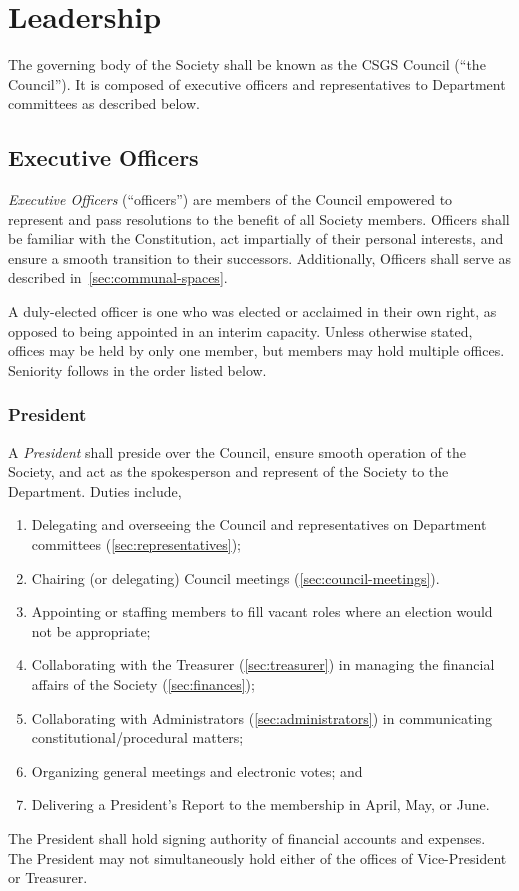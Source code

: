 \section{Leadership}

The governing body of the Society shall be known as the CSGS Council (``the
Council''). It is composed of executive officers and representatives to
Department committees as described below.

\subsection{Executive Officers}\label{sec:officers-duties}

\textit{Executive Officers} (``officers'') are members of the Council empowered to represent and pass resolutions to the benefit of all Society members. Officers shall be familiar with the Constitution, act impartially of their personal interests, and ensure a smooth transition to their successors. Additionally, Officers shall serve as described in~\ref{sec:communal-spaces}.

A duly-elected officer is one who was elected or acclaimed in their own right,
as opposed to being appointed in an interim capacity. Unless otherwise stated,
offices may be held by only one member, but members may hold multiple offices.
Seniority follows in the order listed below.

\subsubsection{President}

A \textit{President} shall preside over the Council, ensure smooth operation of
the Society, and act as the spokesperson and represent of the Society to the
Department. Duties include,

\begin{enumerate}
      \item Delegating and overseeing the Council and representatives on Department
            committees (\ref{sec:representatives});
      \item Chairing (or delegating) Council meetings (\ref{sec:council-meetings}).
      \item Appointing or staffing members to fill vacant roles where an election would not
            be appropriate;
      \item Collaborating with the Treasurer (\ref{sec:treasurer}) in managing the
            financial affairs of the Society (\ref{sec:finances});
      \item Collaborating with Administrators (\ref{sec:administrators}) in communicating
            constitutional/procedural matters;
      \item Organizing general meetings and electronic votes; and
      \item Delivering a President's Report to the membership in April, May, or June.
\end{enumerate}
The President shall hold signing authority of financial accounts and expenses.
The President may not simultaneously hold either of the offices of
Vice-President or Treasurer.

